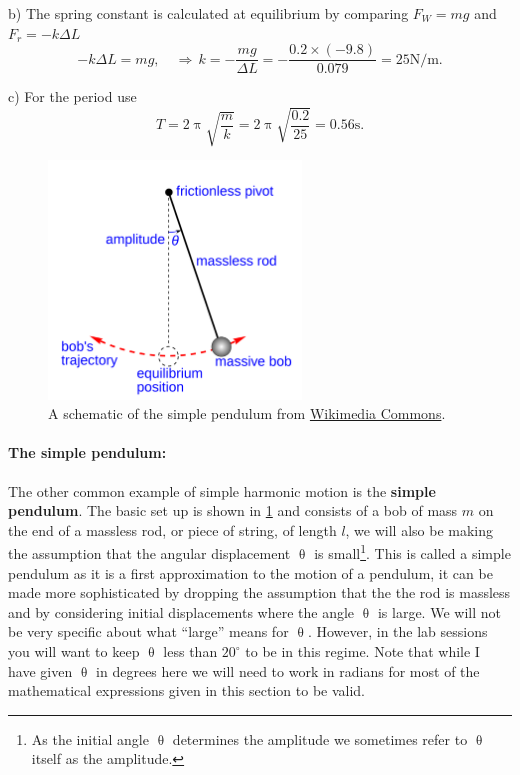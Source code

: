 \documentclass[a4paper,12pt]{book}
\begin{document}
b) The spring constant is calculated at equilibrium by comparing $F_{W}=mg$ and $F_{r}=-k\Delta L$
\begin{equation*}
-k\Delta L=mg , \quad \Rightarrow \, k=-\frac{mg}{\Delta L}=-\frac{0.2\times (-9.8)}{0.079}=25\text{N/m}.
\end{equation*}

c) For the period use
\begin{equation*}
T=2\uppi\sqrt{\frac{m}{k}}=2\uppi\sqrt{\frac{0.2}{25}}=0.56\text{s}.
\end{equation*}


\begin{figure}[ht]
    \centering
   \includegraphics[width=0.6\textwidth]{figures/Simple_gravity_pendulum.png}
    \caption{A schematic of the simple pendulum from \href{https://commons.wikimedia.org/wiki/File:Simple_gravity_pendulum.svg}{Wikimedia Commons}.}
    \label{fig: simple pendulum}
\end{figure}


\paragraph{The simple pendulum:}  The other common example of simple harmonic motion is the \textbf{simple pendulum}. The basic set up is shown in \cref{fig: simple pendulum} and consists of a bob of mass $m$ on the end of a massless rod, or piece of string, of length $l$, we will also be making the assumption that the angular displacement $\uptheta$ is small\footnote{As the initial angle $\uptheta$ determines the amplitude we sometimes refer to $\uptheta$ itself as the amplitude. }. This is called a simple pendulum as it is a first approximation to the motion of a pendulum, it can be made more sophisticated by dropping the assumption that the the rod is massless and by considering initial displacements where the angle $\uptheta$ is large. We will not be very specific about what ``large'' means for $\uptheta$. However, in the lab sessions you will want to keep $\uptheta$ less than $20^{\circ}$ to be in this regime. Note that while I have given $\uptheta$ in degrees here we will need to work in radians for most of the mathematical expressions given in this section to be valid.\\
\end{document}
